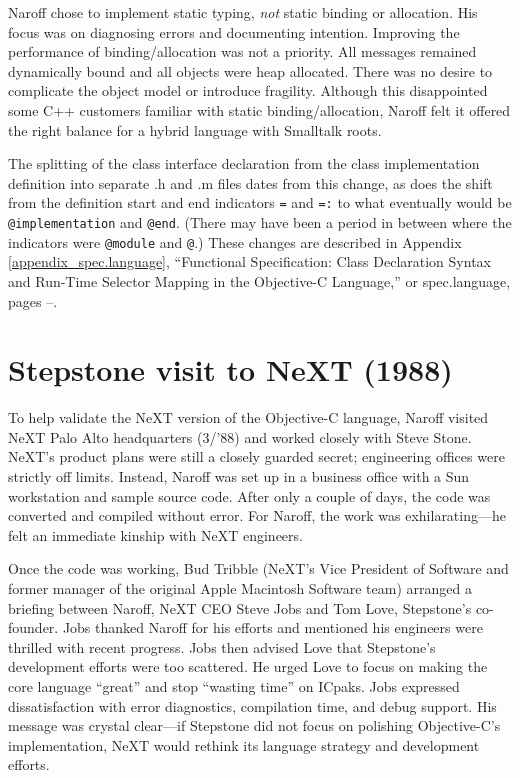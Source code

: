 \documentclass[acmsmall]{acmart}\settopmatter{}
\begin{document}
Naroff chose to implement static typing, \emph{not} static binding or allocation. His focus was on diagnosing errors and documenting intention. Improving the performance of binding/allocation was not a priority. All messages remained dynamically bound and all objects were heap allocated. There was no desire to complicate the object model or introduce fragility. Although this disappointed some C++ customers familiar with static binding/allocation, Naroff felt it offered the right balance for a hybrid language with Smalltalk roots. 

\addtocounter{appendixpagenumrangestart}{2}
\addtocounter{appendixpagenumrangeend}{5}
The splitting of the class interface declaration from the class implementation definition into separate .h and .m files dates from this change, as does the shift from the definition start and end indicators \verb|=| and \verb|=:| to what eventually would be \verb|@implementation| and \verb|@end|. (There may have been a period in between where the indicators were \verb|@module| and \verb|@|.)
These changes are described in Appendix \ref{appendix_spec.language}, ``Functional Specification: Class Declaration Syntax and Run-Time Selector Mapping in the Objective-C Language,'' or spec.language, pages --.

\section{Stepstone visit to NeXT (1988)}
\label{sec-stepstonetoNeXT1988}
To help validate the NeXT version of the Objective-C language, Naroff visited NeXT Palo Alto headquarters (3/'88) and worked closely with Steve Stone. NeXT's product plans were still a closely guarded secret; engineering offices were strictly off limits. Instead, Naroff was set up in a business office with a Sun workstation and sample source code. After only a couple of days, the code was converted and compiled without error. For Naroff, the work was exhilarating---he felt an immediate kinship with NeXT engineers.

Once the code was working, Bud Tribble (NeXT's Vice President of Software and former manager of the original Apple Macintosh Software team) arranged a briefing between Naroff, NeXT CEO Steve Jobs and Tom Love, Stepstone's co-founder. Jobs thanked Naroff for his efforts and mentioned his engineers were thrilled with recent progress. Jobs then advised Love that Stepstone's development efforts were too scattered. He urged Love to focus on making the core language ``great'' and stop ``wasting time'' on ICpaks. Jobs expressed dissatisfaction with error diagnostics, compilation time, and debug support. His message was crystal clear---if Stepstone did not focus on polishing Objective-C's implementation, NeXT would rethink its language strategy and development efforts.
\end{document}
